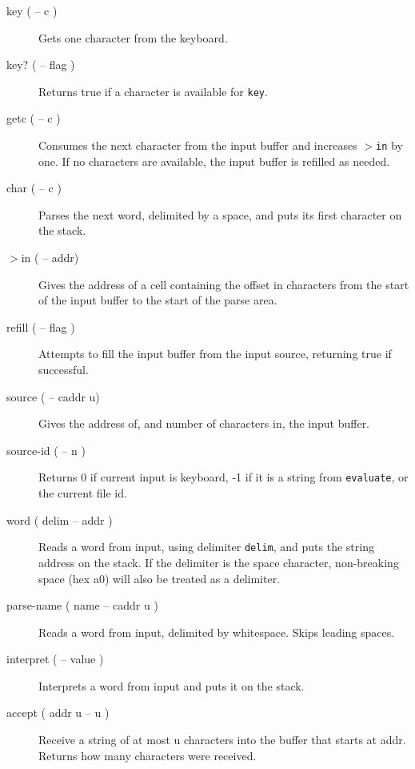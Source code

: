 \begin{description}

\item[key ( -- c )] Gets one character from the keyboard.
\item[key? ( -- flag )] Returns true if a character is available for \texttt{key}.
\item[getc ( -- c )] Consumes the next character from the input buffer and increases \texttt{$>$in} by one. If no characters are available, the input buffer is refilled as needed.

\item[char ( -- c )] Parses the next word, delimited by a space, and puts its first character on the stack.

\item[$>$in ( -- addr)] Gives the address of a cell containing the offset in characters from the start of the input buffer to the start of the parse area.

\item[refill ( -- flag )] Attempts to fill the input buffer from the input source, returning true if successful.

\item[source ( -- caddr u)] Gives the address of, and number of characters in, the input buffer.
\item[source-id ( -- n )] Returns 0 if current input is keyboard, -1 if it is a string from \texttt{evaluate}, or the current file id.

\item[word ( delim -- addr )] Reads a word from input, using delimiter \texttt{delim}, and puts the string address on the stack. If the delimiter is the space character, non-breaking space (hex a0) will also be treated as a delimiter.

\item[parse-name ( name -- caddr u )] Reads a word from input, delimited by whitespace. Skips leading spaces.

\item[interpret ( -- value )] Interprets a word from input and puts it on the stack.

\item[accept ( addr u -- u )] Receive a string of at most u characters into the buffer that starts at addr. Returns how many characters were received.


\end{description}
